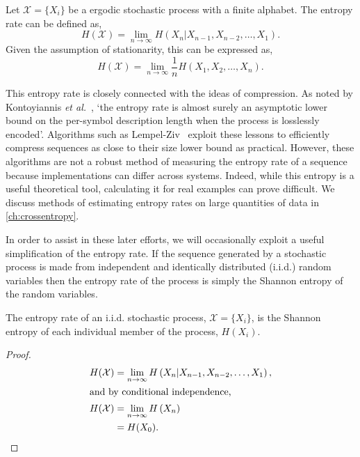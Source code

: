 \begin{definition}\label{def:entropyrate}
	Let  $\mathcal{X}= \{ X_i \}$ be a ergodic stochastic process with a finite alphabet. 
	The entropy rate can be defined as,
	\begin{equation}\label{eq:entropyrate}
	H(\mathcal{X})=\lim _{n \rightarrow \infty} H\left(X_{n} | X_{n-1}, X_{n-2}, \ldots, X_{1}\right).
	\end{equation}
	Given the assumption of stationarity, this can be expressed as,
	\begin{equation}
	H(\mathcal{X})=\lim _{n \rightarrow \infty} \frac{1}{n} H\left(X_{1}, X_{2}, \ldots, X_{n}\right).
	\end{equation}
\end{definition}


This entropy rate is closely connected with the ideas of compression. As noted by Kontoyiannis \emph{et al.}~\cite{kontoyiannis_nonparametric_1998}, `the entropy rate is almost surely an asymptotic lower bound on the per-symbol description length when the process is losslessly encoded'. Algorithms such as Lempel-Ziv~\cite{ziv_compression_1978} exploit these lessons to efficiently compress sequences as close to their size lower bound as practical. However, these algorithms are not a robust method of measuring the entropy rate of a sequence because implementations can differ across systems. Indeed, while this entropy is a useful theoretical tool, calculating it for real examples can prove difficult. We discuss methods of estimating entropy rates on large quantities of data in \autoref{ch:crossentropy}.

In order to assist in these later efforts, we will occasionally exploit a useful simplification of the entropy rate. If the sequence generated by a stochastic process is made from independent and identically distributed  (i.i.d.) random variables then the entropy rate of the process is simply the Shannon entropy of the random variables. 

\begin{lemma}
	The entropy rate of an i.i.d. stochastic process, $\mathcal{X}= \{ X_i \}$, is the Shannon entropy of each individual member of the process, $H(X_i)$.
\end{lemma}

\begin{proof}\label{proof:iidentroptrate}
\begin{align}
H(\mathcal{X})&=\lim _{n \rightarrow \infty} H\left(X_{n} | X_{n-1}, X_{n-2}, \ldots, X_{1}\right), \\
\intertext{and by conditional independence,}
H(\mathcal{X}) &=\lim _{n \rightarrow \infty} H\left(X_{n} \right) \nonumber \\
&= H(X_0).
\end{align}
\end{proof}

